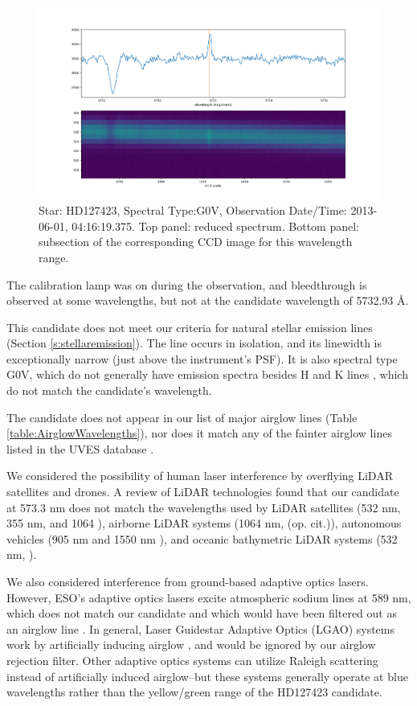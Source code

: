 \documentclass[linenumbers]{aastex631}
\begin{document}
\begin{figure}
    \centering  \includegraphics[width=\textwidth]{HD127423.png}
    \caption{Star: HD127423, Spectral Type:G0V, Observation Date/Time: 2013-06-01, 04:16:19.375. Top panel: reduced spectrum.  Bottom panel: subsection of the corresponding CCD image for this wavelength range.}
    \label{fig:seti_candidate_HD127423}
\end{figure}

The calibration lamp was on during the observation, and bleedthrough is observed at some wavelengths, but not at the candidate wavelength of 5732.93 \AA.

This candidate does not meet our criteria for natural stellar emission lines (Section \ref{s:stellaremission}).  The line occurs in isolation, and its linewidth is exceptionally narrow (just above the instrument's PSF). It is also spectral type G0V, which do not generally have emission spectra besides H and K lines \citep{HandKemissionlines}, which do not match the candidate's wavelength. 

The candidate does not appear in our list of major airglow lines (Table \ref{table:AirglowWavelengths}), nor does it match any of the fainter airglow lines listed in the UVES database \citep{faint_airglow_database} \citep{UVES_database}. 

We considered the possibility of human laser interference by overflying LiDAR satellites and drones.  A review of LiDAR technologies found that our candidate at 573.3 nm does not match the wavelengths used by LiDAR satellites (532 nm, 355 nm, and 1064 \citep{lidar_history}), airborne LiDAR systems (1064 nm, (op. cit.)), autonomous vehicles (905 nm and 1550 nm \citep{vehicle_lidar}), and oceanic bathymetric LiDAR systems (532 nm, \citep{bathymetric_lidar}). 

We also considered interference from ground-based adaptive optics lasers. However, ESO's adaptive optics lasers excite atmospheric sodium lines at 589 nm, which does not match our candidate and which would have been filtered out as an airglow line \citep{HARPS_guidestars}. In general, Laser Guidestar Adaptive Optics (LGAO) systems work by artificially inducing airglow \citep{LaserGuideStarAdaptiveOptics}, and would be ignored by our airglow rejection filter.  Other adaptive optics systems can utilize Raleigh scattering instead of artificially induced airglow--but these systems generally operate at blue wavelengths \citep{RaleighScattering} rather than the yellow/green range of the HD127423 candidate.
\end{document}
